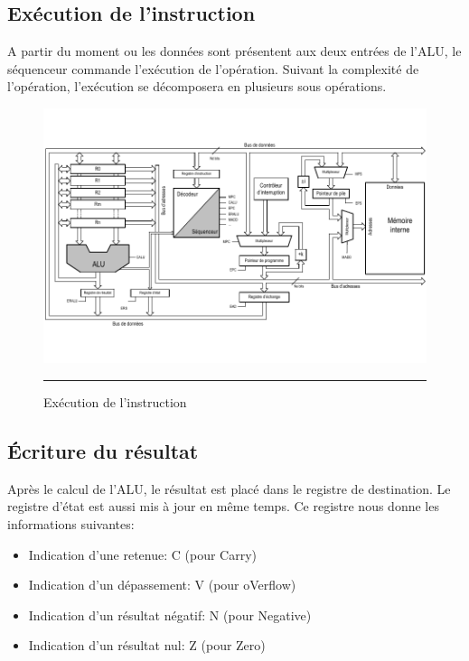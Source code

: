 \subsection{Exécution de l'instruction}
A partir du moment ou les données sont présentent aux deux entrées de l'ALU, le séquenceur commande l'exécution de l'opération. Suivant la complexité de l'opération, l'exécution se décomposera en plusieurs sous opérations.

\begin{figure}[htb]
  \centering
  \includegraphics[angle=0, width=15cm, trim=0 30 0 30,clip]{./Figures/cpu/instruction4.pdf}
  \rule{35em}{0.5pt}
  \caption[instr4]{Exécution de l'instruction}
  \label{fig:instr4}
\end{figure}

\newpage
\subsection{Écriture du résultat}
Après le calcul de l'ALU, le résultat est placé dans le registre de destination. Le registre d'état est aussi mis à jour en même temps. Ce registre nous donne les informations suivantes:

\begin{itemize}[label=\textbullet,font=\small]
\item Indication d'une retenue: C (pour Carry)
\item Indication d'un dépassement: V (pour oVerflow)
\item Indication d'un résultat négatif: N (pour Negative)
\item Indication d'un résultat nul: Z (pour Zero)
\end{itemize}

